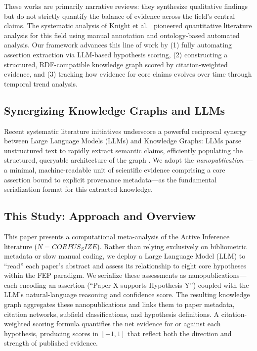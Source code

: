 \documentclass[
]{article}
\begin{document}
These works are primarily narrative reviews: they synthesize qualitative
findings but do not strictly quantify the balance of evidence across the
field's central claims. The systematic analysis of Knight et
al.~\citep{knight2022fep} pioneered quantitative literature analysis for
this field using manual annotation and ontology-based automated
analysis. Our framework advances this line of work by (1) fully
automating assertion extraction via LLM-based hypothesis scoring, (2)
constructing a structured, RDF-compatible knowledge graph scored by
citation-weighted evidence, and (3) tracking how evidence for core
claims evolves over time through temporal trend analysis.

\subsection{Synergizing Knowledge Graphs and
LLMs}\label{synergizing-knowledge-graphs-and-llms}

Recent systematic literature initiatives underscore a powerful
reciprocal synergy between Large Language Models (LLMs) and Knowledge
Graphs: LLMs parse unstructured text to rapidly extract semantic claims,
efficiently populating the structured, queryable architecture of the
graph \citep{quevedo2025combining, li2024unifying}. We adopt the
\emph{nanopublication} \citep{groth2010anatomy}---a minimal,
machine-readable unit of scientific evidence comprising a core assertion
bound to explicit provenance metadata---as the fundamental serialization
format for this extracted knowledge.

\subsection{This Study: Approach and
Overview}\label{this-study-approach-and-overview}

This paper presents a computational meta-analysis of the Active
Inference literature (\(N = {{CORPUS_SIZE}}\)). Rather than relying
exclusively on bibliometric metadata or slow manual coding, we deploy a
Large Language Model (LLM) to ``read'' each paper's abstract and assess
its relationship to eight core hypotheses within the FEP paradigm. We
serialize these assessments as nanopublications---each encoding an
assertion (``Paper X supports Hypothesis Y'') coupled with the LLM's
natural-language reasoning and confidence score. The resulting knowledge
graph aggregates these nanopublications and links them to paper
metadata, citation networks, subfield classifications, and hypothesis
definitions. A citation-weighted scoring formula quantifies the net
evidence for or against each hypothesis, producing scores in \([-1, 1]\)
that reflect both the direction and strength of published evidence.
\end{document}
